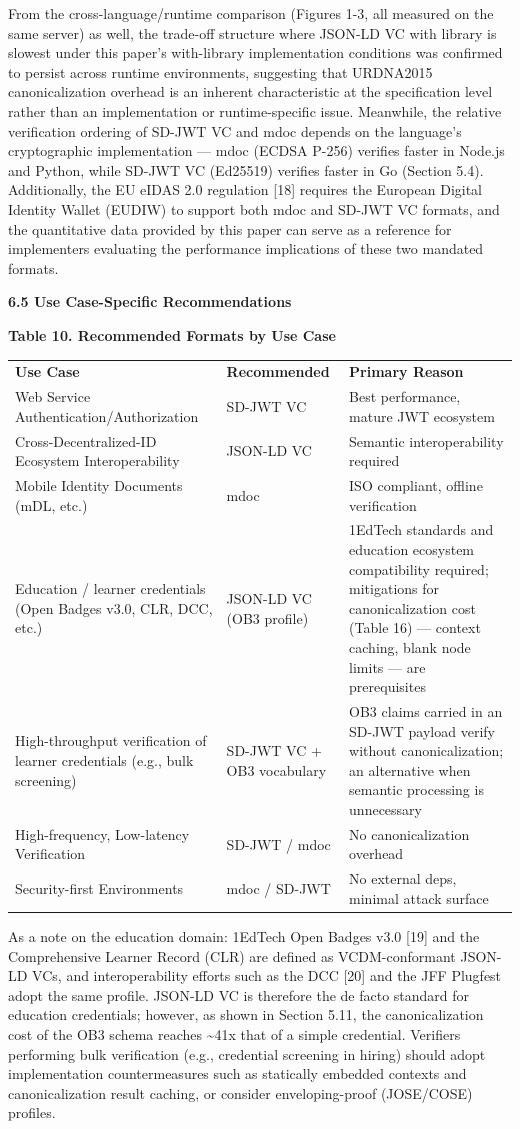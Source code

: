 From the cross-language/runtime comparison (Figures 1-3, all measured on the same server) as well, the trade-off structure where JSON-LD VC with library is slowest under this paper's with-library implementation conditions was confirmed to persist across runtime environments, suggesting that URDNA2015 canonicalization overhead is an inherent characteristic at the specification level rather than an implementation or runtime-specific issue. Meanwhile, the relative verification ordering of SD-JWT VC and mdoc depends on the language's cryptographic implementation --- mdoc (ECDSA P-256) verifies faster in Node.js and Python, while SD-JWT VC (Ed25519) verifies faster in Go (Section 5.4). Additionally, the EU eIDAS 2.0 regulation {[}18{]} requires the European Digital Identity Wallet (EUDIW) to support both mdoc and SD-JWT VC formats, and the quantitative data provided by this paper can serve as a reference for implementers evaluating the performance implications of these two mandated formats.

\textbf{6.5 Use Case-Specific Recommendations}

\textbf{Table 10. Recommended Formats by Use Case}

\begin{longtable}[]{@{}lll@{}}
\toprule
\endhead
\textbf{Use Case} & \textbf{Recommended} & \textbf{Primary Reason}\tabularnewline
Web Service Authentication/Authorization & SD-JWT VC & Best performance, mature JWT ecosystem\tabularnewline
Cross-Decentralized-ID Ecosystem Interoperability & JSON-LD VC & Semantic interoperability required\tabularnewline
Mobile Identity Documents (mDL, etc.) & mdoc & ISO compliant, offline verification\tabularnewline
Education / learner credentials (Open Badges v3.0, CLR, DCC, etc.) & JSON-LD VC (OB3 profile) & 1EdTech standards and education ecosystem compatibility required; mitigations for canonicalization cost (Table 16) --- context caching, blank node limits --- are prerequisites\tabularnewline
High-throughput verification of learner credentials (e.g., bulk screening) & SD-JWT VC + OB3 vocabulary & OB3 claims carried in an SD-JWT payload verify without canonicalization; an alternative when semantic processing is unnecessary\tabularnewline
High-frequency, Low-latency Verification & SD-JWT / mdoc & No canonicalization overhead\tabularnewline
Security-first Environments & mdoc / SD-JWT & No external deps, minimal attack surface\tabularnewline
\bottomrule
\end{longtable}

As a note on the education domain: 1EdTech Open Badges v3.0 {[}19{]} and the Comprehensive Learner Record (CLR) are defined as VCDM-conformant JSON-LD VCs, and interoperability efforts such as the DCC {[}20{]} and the JFF Plugfest adopt the same profile. JSON-LD VC is therefore the de facto standard for education credentials; however, as shown in Section 5.11, the canonicalization cost of the OB3 schema reaches \textasciitilde41x that of a simple credential. Verifiers performing bulk verification (e.g., credential screening in hiring) should adopt implementation countermeasures such as statically embedded contexts and canonicalization result caching, or consider enveloping-proof (JOSE/COSE) profiles.

